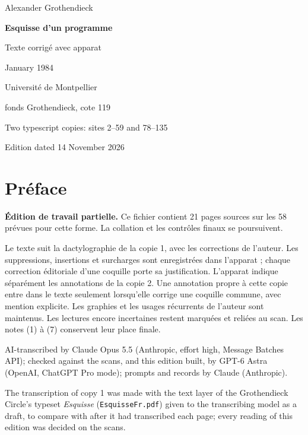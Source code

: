 \documentclass[11pt,a4paper]{article}
\newcommand{\EditionTitle}{Esquisse d'un programme}
\newcommand{\EditionForm}{Texte corrigé avec apparat}
\begin{document}
\begin{titlepage}
\centering
\vspace*{18mm}
{\Large Alexander Grothendieck\par}
\vspace{12mm}
{\Huge\bfseries\EditionTitle\par}
\vspace{8mm}
{\Large\EditionForm\par}
\vspace{14mm}
{\large January 1984\par}
\vfill
{\large Université de Montpellier\par fonds Grothendieck, cote 119\par}
\vspace{8mm}
{\normalsize Two typescript copies: sites 2--59 and 78--135\par}
\vspace{8mm}
{\normalsize Edition dated 14 November 2026\par}
\end{titlepage}
\thispagestyle{plain}
\section*{Préface}
\noindent\textbf{Édition de travail partielle.} Ce fichier contient 21 pages sources sur les 58 prévues pour cette forme. La collation et les contrôles finaux se poursuivent.\par\smallskip
Le texte suit la dactylographie de la copie 1, avec les corrections de l’auteur. Les suppressions, insertions et surcharges sont enregistrées dans l’apparat ; chaque correction éditoriale d’une coquille porte sa justification. L’apparat indique séparément les annotations de la copie 2. Une annotation propre à cette copie entre dans le texte seulement lorsqu’elle corrige une coquille commune, avec mention explicite. Les graphies et les usages récurrents de l’auteur sont maintenus. Les lectures encore incertaines restent marquées et reliées au scan. Les notes (1) à (7) conservent leur place finale.

\smallskip
AI-transcribed by Claude Opus 5.5 (Anthropic, effort high, Message Batches API); checked against the scans, and this edition built, by GPT-6 Astra (OpenAI, ChatGPT Pro mode); prompts and records by Claude (Anthropic).


The transcription of copy 1 was made with the text layer of the Grothendieck Circle's typeset \textit{Esquisse} (\texttt{EsquisseFr.pdf}) given to the transcribing model as a draft, to compare with after it had transcribed each page; every reading of this edition was decided on the scans.
\end{document}

